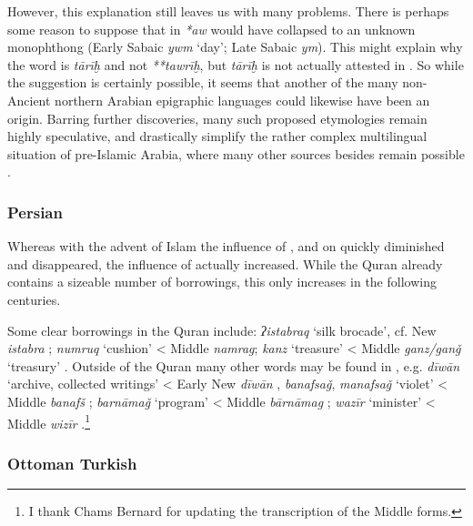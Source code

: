\documentclass[output=paper]{langsci/langscibook}
\begin{document}
However, this explanation still leaves us with many problems. There is perhaps some reason to suppose that in  \textit{*aw} would have collapsed to an unknown {monophthong} (Early Sabaic \textit{ywm} ‘day’; {Late} Sabaic \textit{ym}). This might explain why the word is \textit{tārīḫ} and not \textit{**tawrīḫ}, but \textit{tārīḫ} is not actually attested in . So while the suggestion is certainly possible, it seems that another of the many non- Ancient northern Arabian epigraphic languages could likewise have been an origin. Barring further discoveries, many such proposed etymologies remain highly speculative, and drastically simplify the rather complex multilingual situation of pre-Islamic Arabia, where many other sources besides  remain possible \citep{Al-Jallad2018ANA}.

\subsubsection{\label{bkm:Ref13224492}Persian}

Whereas with the advent of Islam the influence of ,  and  on  quickly diminished and disappeared, the influence of  actually increased. While the {Quran} already contains a sizeable number of  borrowings, this only increases in the following centuries.

Some clear  borrowings in the {Quran} include: \textit{ʔistabraq} `silk brocade', cf. New  \textit{istabra} \citep[204]{Eilers1962}; \textit{numruq} `cushion' < Middle  \textit{namrag}; \textit{kanz} ‘treasure’ < Middle  \textit{ganz/ganǧ} ‘treasury’ \citep[206]{Eilers1962}. Outside of the {Quran} many other  words may be found in , e.g. \textit{dīwān} ‘archive, collected writings’ < Early New  \textit{dīwān} \citep[223]{Eilers1962}, \textit{banafsaǧ}, \textit{manafsaǧ} ‘violet’ < Middle  \textit{banafš} \citep[596]{Eilers1971}; \textit{barnāmaǧ} ‘program’ < Middle  \textit{bārnāmag} \citep[217-218]{Eilers1962}; \textit{wazīr} ‘minister’ < Middle  \textit{wizīr} \citep[207]{Eilers1962}.\footnote{I thank Chams Bernard for updating the transcription of the Middle  forms.}

\subsubsection{\label{bkm:Ref13483797}Ottoman Turkish}
\end{document}
